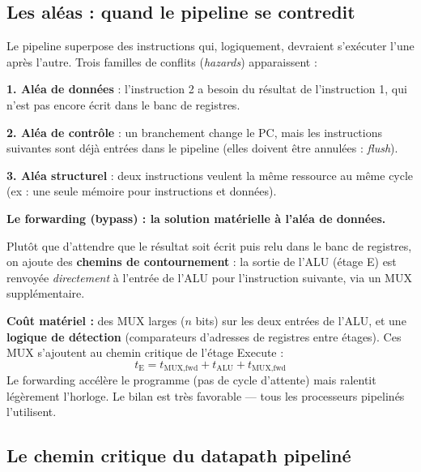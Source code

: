\documentclass[12pt,a4paper,twoside]{book}
\begin{document}
\subsection{Les aléas : quand le pipeline se contredit}

\begin{attention}
Le pipeline superpose des instructions qui, logiquement, devraient s'exécuter l'une après l'autre. Trois familles de conflits (\textit{hazards}) apparaissent :

\textbf{1. Aléa de données} : l'instruction 2 a besoin du résultat de l'instruction 1, qui n'est pas encore écrit dans le banc de registres.

\textbf{2. Aléa de contrôle} : un branchement change le PC, mais les instructions suivantes sont déjà entrées dans le pipeline (elles doivent être annulées : \textit{flush}).

\textbf{3. Aléa structurel} : deux instructions veulent la même ressource au même cycle (ex : une seule mémoire pour instructions et données).
\end{attention}

\begin{formule}
\textbf{Le forwarding (bypass) : la solution matérielle à l'aléa de données.}

Plutôt que d'attendre que le résultat soit écrit puis relu dans le banc de registres, on ajoute des \textbf{chemins de contournement} : la sortie de l'ALU (étage E) est renvoyée \textit{directement} à l'entrée de l'ALU pour l'instruction suivante, via un MUX supplémentaire.

\textbf{Coût matériel :} des MUX larges ($n$ bits) sur les deux entrées de l'ALU, et une \textbf{logique de détection} (comparateurs d'adresses de registres entre étages). Ces MUX s'ajoutent au chemin critique de l'étage Execute :
\[
t_{\text{E}} = t_{\text{MUX,fwd}} + t_{\text{ALU}} + t_{\text{MUX,fwd}}
\]
Le forwarding accélère le programme (pas de cycle d'attente) mais ralentit légèrement l'horloge. Le bilan est très favorable --- tous les processeurs pipelinés l'utilisent.
\end{formule}

\subsection{Le chemin critique du datapath pipeliné}
\end{document}
